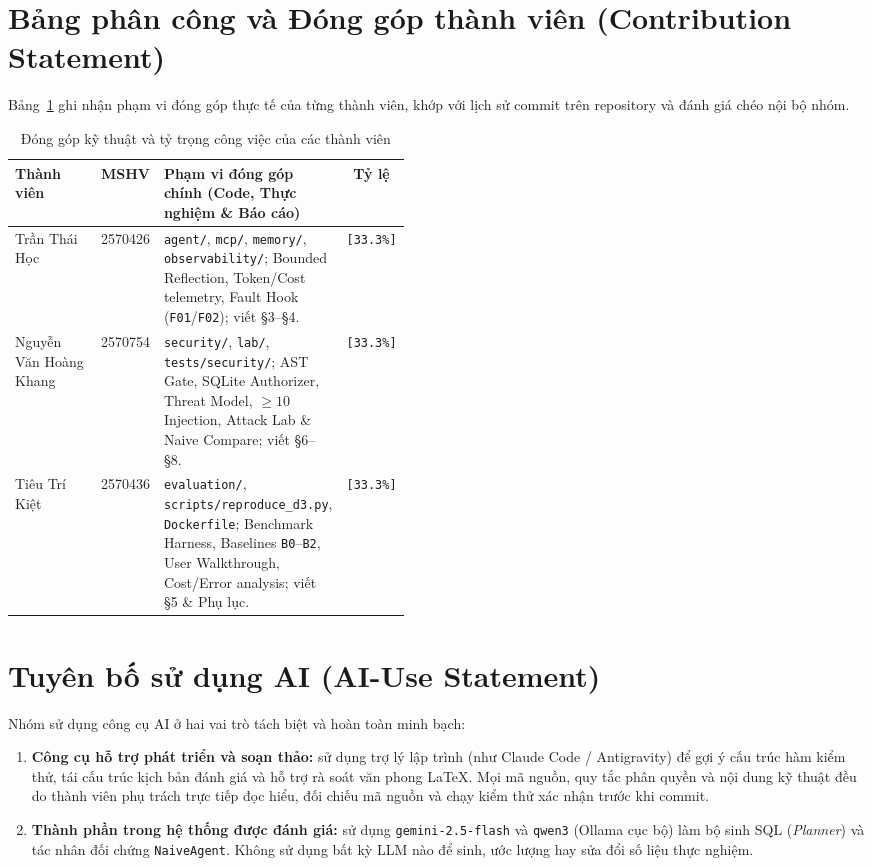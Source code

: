\section{Bảng phân công và Đóng góp thành viên (Contribution Statement)}
\label{app:contributions}

\noindent Bảng~\ref{tab:contributions} ghi nhận phạm vi đóng góp thực tế của từng thành viên, khớp với lịch sử commit trên repository và đánh giá chéo nội bộ nhóm.

\begin{table}[H]
\centering
\caption{Đóng góp kỹ thuật và tỷ trọng công việc của các thành viên}
\label{tab:contributions}
\footnotesize
\renewcommand{\arraystretch}{1.15}
\begin{tabular}{|l|c|p{0.46\linewidth}|c|}
\hline
\rowcolor{tableheader}
\textbf{Thành viên} & \textbf{MSHV} & \textbf{Phạm vi đóng góp chính (Code, Thực nghiệm \& Báo cáo)} & \textbf{Tỷ lệ} \\ \hline
Trần Thái Học & 2570426 & \texttt{agent/}, \texttt{mcp/}, \texttt{memory/}, \texttt{observability/}; Bounded Reflection, Token/Cost telemetry, Fault Hook (\texttt{F01}/\texttt{F02}); viết \S 3--\S 4. & \texttt{[33.3\%]} \\ \hline
Nguyễn Văn Hoàng Khang & 2570754 & \texttt{security/}, \texttt{lab/}, \texttt{tests/security/}; AST Gate, SQLite Authorizer, Threat Model, $\ge 10$ Injection, Attack Lab \& Naive Compare; viết \S 6--\S 8. & \texttt{[33.3\%]} \\ \hline
Tiêu Trí Kiệt & 2570436 & \texttt{evaluation/}, \texttt{scripts/reproduce\_d3.py}, \texttt{Dockerfile}; Benchmark Harness, Baselines \texttt{B0}--\texttt{B2}, User Walkthrough, Cost/Error analysis; viết \S 5 \& Phụ lục. & \texttt{[33.3\%]} \\ \hline
\end{tabular}
\end{table}

\section{Tuyên bố sử dụng AI (AI-Use Statement)}
\label{app:ai-use}

\noindent Nhóm sử dụng công cụ AI ở hai vai trò tách biệt và hoàn toàn minh bạch:
\begin{enumerate}
    \item \textbf{Công cụ hỗ trợ phát triển và soạn thảo:} sử dụng trợ lý lập trình (như Claude Code / Antigravity) để gợi ý cấu trúc hàm kiểm thử, tái cấu trúc kịch bản đánh giá và hỗ trợ rà soát văn phong LaTeX. Mọi mã nguồn, quy tắc phân quyền và nội dung kỹ thuật đều do thành viên phụ trách trực tiếp đọc hiểu, đối chiếu mã nguồn và chạy kiểm thử xác nhận trước khi commit.
    \item \textbf{Thành phần trong hệ thống được đánh giá:} sử dụng \texttt{gemini-2.5-flash} và \texttt{qwen3} (Ollama cục bộ) làm bộ sinh SQL (\textit{Planner}) và tác nhân đối chứng \texttt{NaiveAgent}. Không sử dụng bất kỳ LLM nào để sinh, ước lượng hay sửa đổi số liệu thực nghiệm.
\end{enumerate}


